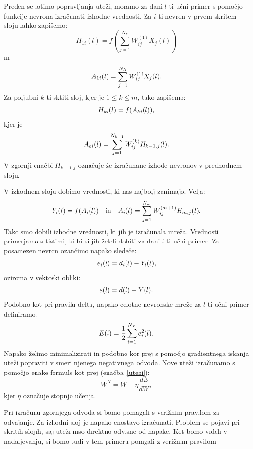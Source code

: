\documentclass[mat1]{fmfdelo}
\begin{document}
Preden se lotimo popravljanja uteži, moramo za dani $l$-ti učni primer s pomočjo funkcije nevrona izračunati izhodne vrednosti. Za $i$-ti nevron v prvem skritem sloju lahko zapišemo:
%
\begin{equation*}
H_{1i}(l) = f\left( \sum^{N_X}_{j=1}{W^{(1)}_{ij}X_j(l)}\right)
\end{equation*}
%
in
%
\begin{equation*}
A_{1i}(l) =\sum^{N_X}_{j=1}{W^{(1)}_{ij}X_j(l)}\text.
\end{equation*}
%
Za poljubni $k$-ti sktiti sloj, kjer je $1\leq k \leq m$, tako zapišemo:
%
\begin{equation*}
H_{ki}(l) = f(A_{ki}(l))\text,
\end{equation*}
%
kjer je
%
\begin{equation*}
A_{ki}(l) = \sum^{N_{k-1}}_{j=1}W^{(k)}_{ij}H_{k-1,j}(l)\text.
\end{equation*}
%
V zgornji enačbi $H_{k-1,j}$ označuje že izračunane izhode nevronov v predhodnem sloju.
 
 V izhodnem sloju dobimo vrednosti, ki nas najbolj zanimajo. Velja:
%
\begin{equation*}
Y_{i}(l) = f(A_{i}(l)) \quad \text{in} \quad A_{i}(l) = \sum^{N_{m}}_{j=1}{W^{(m+1)}_{ij}H_{m,j}(l)}\text.
\end{equation*}
%
Tako smo dobili izhodne vrednosti, ki jih je izračunala mreža. Vrednosti primerjamo s tistimi, ki bi si jih želeli dobiti za dani $l$-ti učni primer. Za posamezen nevron ozančimo napako sledeče:
%
\begin{equation}
e_i(l) = d_i(l) - Y_i(l)\text,
\end{equation}
oziroma v vektoski obliki:
\begin{equation*}
e(l) = d(l) - Y(l)\text.
\end{equation*}
Podobno kot pri pravilu delta, napako celotne nevronske mreže za $l$-ti učni primer definiramo:
%
\begin{equation}
E(l) = \frac{1}{2}\sum^{N_Y}_{i=1}e_i^2(l)\text.
\label{napaka}
\end{equation}
%
Napako želimo minimalizirati in podobno kor prej s pomočjo gradientnega iskanja uteži popraviti v smeri njenega negativnega odvoda. Nove uteži izračunamo s pomočjo enake formule kot prej (enačba~\eqref{utezi}):
\begin{equation*}
W^{N} = W - \eta \frac{dE}{dW}, 
\end{equation*}
%
kjer $\eta$ označuje stopnjo učenja. 

Pri izračunu zgornjega odvoda si bomo pomagali s verižnim pravilom za odvajanje. Za izhodni sloj je napako enostavo izračunati. Problem se pojavi pri skritih slojih, saj uteži niso direktno odvisne od napake. Kot bomo videli v nadaljevanju, si bomo tudi v tem primeru pomgali z verižnim pravilom. 
\end{document}
